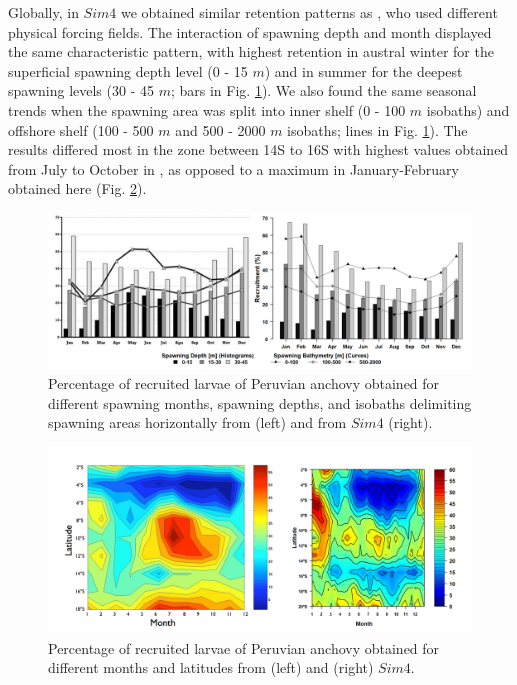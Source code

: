 Globally, in $Sim 4$ we obtained similar retention patterns as \cite{BrocLett2008}, who used different physical forcing fields. The interaction of spawning depth and month displayed the same characteristic pattern, with highest retention in austral winter for the superficial spawning depth level (0 - 15 $m$) and in summer for the deepest spawning levels (30 - 45 $m$; bars in Fig. \ref{Chap3BrocVSFloreBarplots}). We also found the same seasonal trends when the spawning area was split into inner shelf (0 - 100 $m$ isobaths) and offshore shelf (100 - 500 $m$ and 500 - 2000 $m$ isobaths; lines in Fig. \ref{Chap3BrocVSFloreBarplots}). The results differed most in the zone between 14\textdegree S to 16\textdegree S with highest values obtained from July to October in \cite{BrocLett2008}, as opposed to a maximum in January-February obtained here (Fig. \ref{Chap3BrocVSFloreHovmuller}).\\

\begin{figure}[H]
	\includegraphics[width=1.0\textwidth]{figures/Chap3BrocVSFloreBarplots.png}
	\centering
	\caption{Percentage of recruited larvae of Peruvian anchovy obtained for different spawning months, spawning depths, and isobaths delimiting spawning areas horizontally from \cite{BrocLett2008} (left) and from $Sim 4$ (right).}
	\label{Chap3BrocVSFloreBarplots}
\end{figure}

\begin{figure}[H]
	\includegraphics[width=1.0\textwidth]{figures/Chap3BrocVSFloreHovmuller.png}
	\centering
	\caption{Percentage of recruited larvae of Peruvian anchovy obtained for different months and latitudes from (left) \cite{BrocLett2008} and (right) $Sim 4$.}
	\label{Chap3BrocVSFloreHovmuller}
\end{figure}

